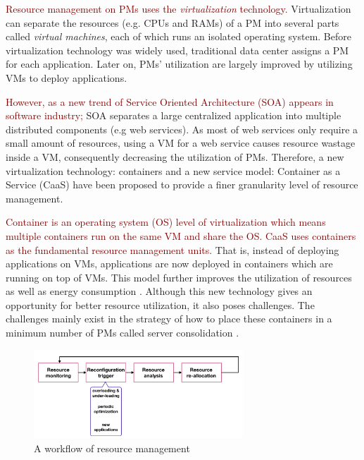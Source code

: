\textcolor{Maroon}{Resource management on PMs uses the \emph{virtualization} technology\cite{Uhlig:2005do}. } Virtualization can separate the resources (e.g. CPUs and RAMs) of a PM into several parts called \emph{virtual machines}, each of which runs an isolated operating system. Before virtualization technology was widely used, traditional data center assigns a PM for each application. Later on, PMs' utilization are largely improved by utilizing VMs to deploy applications. 

\textcolor{Maroon}{However, as a new trend of Service Oriented Architecture (SOA) \cite{Sprott:2004wt} appears in software industry;} SOA separates a large centralized application into multiple distributed components (e.g web services). As most of web services only require a small amount of resources,  using a VM for a web service causes resource wastage inside a VM, consequently decreasing the utilization of PMs. Therefore, a new virtualization technology: containers \cite{Felter:2015ki, Soltesz:2007cu} and a new service model: Container as a Service (CaaS) \cite{Piraghaj:2015uf} have been proposed to provide a finer granularity level of resource management. 

\textcolor{Maroon}{Container is an operating system (OS) level of virtualization which means multiple containers run on the same VM and share the OS. CaaS uses containers as the fundamental resource management units.}  That is, instead of deploying applications on VMs, applications are now deployed in containers which are running on top of VMs. This model further improves the utilization of resources as well as energy consumption \cite{Esposito:2016br}. Although this new technology gives an opportunity for better resource utilization, it also poses challenges. The challenges mainly exist in the strategy of how to place these containers in a minimum number of PMs called server consolidation \cite{Varasteh:2015fu}.

\begin{figure}
	\centering
	\includegraphics[width=0.7\textwidth]{pics/workflow_management.png}
	\caption{A workflow of resource management \cite{Mishra:2012kx}}
	\label{fig:workflow}
\end{figure}


